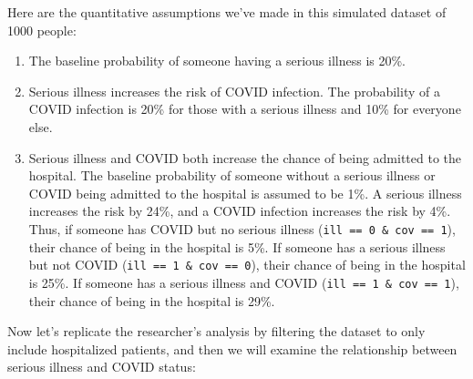 \documentclass[
]{book}
\newenvironment{Shaded}{\begin{snugshade}}{\end{snugshade}}
\newcommand{\AttributeTok}[1]{\textcolor[rgb]{0.13,0.29,0.53}{#1}}
\newcommand{\CommentTok}[1]{\textcolor[rgb]{0.56,0.35,0.01}{\textit{#1}}}
\newcommand{\DecValTok}[1]{\textcolor[rgb]{0.00,0.00,0.81}{#1}}
\newcommand{\FunctionTok}[1]{\textcolor[rgb]{0.13,0.29,0.53}{\textbf{#1}}}
\newcommand{\NormalTok}[1]{#1}
\newcommand{\OtherTok}[1]{\textcolor[rgb]{0.56,0.35,0.01}{#1}}
\newcommand{\SpecialCharTok}[1]{\textcolor[rgb]{0.81,0.36,0.00}{\textbf{#1}}}
\newcommand{\StringTok}[1]{\textcolor[rgb]{0.31,0.60,0.02}{#1}}
\providecommand{\tightlist}{%
  \setlength{\itemsep}{0pt}\setlength{\parskip}{0pt}}
\begin{document}
Here are the quantitative assumptions we've made in this simulated dataset of 1000 people:

\begin{enumerate}
\def\labelenumi{\arabic{enumi}.}
\tightlist
\item
  The baseline probability of someone having a serious illness is 20\%.
\item
  Serious illness increases the risk of COVID infection. The probability of a COVID infection is 20\% for those with a serious illness and 10\% for everyone else.
\item
  Serious illness and COVID both increase the chance of being admitted to the hospital. The baseline probability of someone without a serious illness or COVID being admitted to the hospital is assumed to be 1\%. A serious illness increases the risk by 24\%, and a COVID infection increases the risk by 4\%. Thus, if someone has COVID but no serious illness (\texttt{ill\ ==\ 0\ \&\ cov\ ==\ 1}), their chance of being in the hospital is 5\%. If someone has a serious illness but not COVID (\texttt{ill\ ==\ 1\ \&\ cov\ ==\ 0}), their chance of being in the hospital is 25\%. If someone has a serious illness and COVID (\texttt{ill\ ==\ 1\ \&\ cov\ ==\ 1}), their chance of being in the hospital is 29\%.
\end{enumerate}

Now let's replicate the researcher's analysis by filtering the dataset to only include hospitalized patients, and then we will examine the relationship between serious illness and COVID status:

\begin{Shaded}
\end{Shaded}
\end{document}
